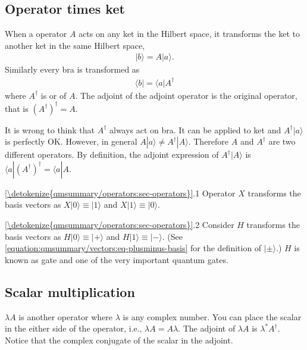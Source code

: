 \documentclass[letterpaper,10pt,english]{jupyterBook}
\begin{document}
\subsection{Operator times ket}
\label{\detokenize{qmsummary/operators:operator-times-ket}}\label{\detokenize{qmsummary/operators:pp-times-ket}}
\sphinxAtStartPar
When a operator \(A\) acts on any ket in the Hilbert space, it transforms the ket to another ket in the same Hilbert space,
\begin{equation*}
\begin{split}
|b\rangle = A |a\rangle.
\end{split}
\end{equation*}
\sphinxAtStartPar
Similarly every bra is transformed as
\begin{equation*}
\begin{split}
\langle b| = \langle a | A^\dagger
\end{split}
\end{equation*}
\sphinxAtStartPar
where \(A^\dagger\) is  or  of \(A\).  The adjoint of the adjoint operator is the original operator, that is  \((A^\dagger)^\dagger = A\).

\sphinxAtStartPar
It is wrong to think that \(A^\dagger\) always act on bra.  It can be applied to ket and \(A^\dagger | a\rangle\) is perfectly OK.  However, in general \(A |a\rangle \ne A^\dagger |A\rangle\). Therefore \(A\) and \(A^\dagger\) are two different operators.  By definition, the adjoint expression of \(A^\dagger |A\rangle\) is \(\langle a| (A^\dagger)^\dagger = \langle a| A\).

\sphinxAtStartPar
{} \hyperref[\detokenize{qmsummary/operators:sec-operators}]{\ref{\detokenize{qmsummary/operators:sec-operators}}}.1  Operator \(X\) transforms the basis vectors as \(X |0\rangle \equiv |1\rangle\) and \(X|1\rangle \equiv |0\rangle\).

\sphinxAtStartPar
{} \hyperref[\detokenize{qmsummary/operators:sec-operators}]{\ref{\detokenize{qmsummary/operators:sec-operators}}}.2  Consider \(H\) transforms the basis vectors as \(H|0\rangle \equiv |+\rangle\) and \(H|1\rangle \equiv |-\rangle\).
(See \eqref{equation:qmsummary/vectors:eq-plusminus-basis} for the definition of \(|\pm\rangle\).)  \(H\) is known as  gate and one of the very important quantum gates.


\subsection{Scalar multiplication}
\label{\detokenize{qmsummary/operators:scalar-multiplication}}
\sphinxAtStartPar
\(\lambda A\) is another operator where \(\lambda\) is any complex number.  You can place the scalar in the either side of the operator, i.e., \(\lambda A = A \lambda\). The adjoint of \(\lambda A\) is \(\lambda^* A^\dagger\).  Notice that the complex conjugate of the scalar in the adjoint.
\end{document}
